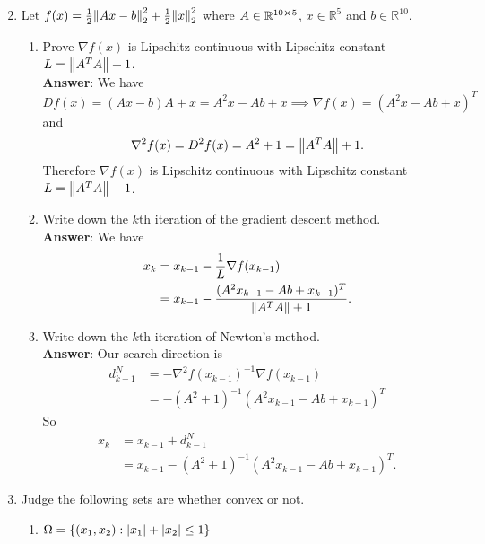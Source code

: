 \documentclass{article}
\begin{document}
\begin{enumerate}
\begin{enumerate}
\[                    \]
          \end{enumerate}
          \newpage
    \item Let $f(x)=\frac{1}{2}\norm{Ax-b}_2^2+\frac{1}{2}\norm{x}_2^2$ where $A\in\mathbb{R}^{10\cross 5}$, $x\in\mathbb{R}^5$ and $b\in\mathbb{R}^{10}$.
          \begin{enumerate}
              \item Prove $\nabla f(x)$ is Lipschitz continuous with Lipschitz constant $L=\norm{A^TA}+1$.\\
                    \textbf{Answer}: We have \[Df(x)=(Ax-b)A+x=A^2x-Ab+x\implies\nabla f(x)=(A^2x-Ab+x)^T\] and \[\nabla^2 f(x)=D^2f(x)=A^2+1=\norm{A^TA}+1.\] Therefore $\nabla f(x)$ is Lipschitz continuous with Lipschitz constant $L=\norm{A^TA}+1$.
              \item Write down the $k$th iteration of the gradient descent method.\\
                    \textbf{Answer}: We have \begin{align*}
                        x_k & =x_{k-1}-\dfrac{1}{L}\nabla f(x_{k-1})                     \\
                            & =x_{k-1}-\dfrac{(A^2x_{k-1}-Ab+x_{k-1})^T}{\norm{A^TA}+1}.
                    \end{align*}
              \item Write down the $k$th iteration of Newton's method.\\
                    \textbf{Answer}: Our search direction is
                    \begin{align*}
                        d_{k-1}^N & =-\nabla^2f(x_{k-1})^{-1}\nabla f(x_{k-1}) \\
                                  & =-(A^2+1)^{-1}(A^2x_{k-1}-Ab+x_{k-1})^T
                    \end{align*}
                    So
                    \begin{align*}
                        x_k & =x_{k-1}+ d_{k-1}^N                        \\
                            & =x_{k-1}-(A^2+1)^{-1}(A^2x_{k-1}-Ab+x_{k-1})^T.
                    \end{align*}
          \end{enumerate}
          \newpage
    \item Judge the following sets are whether convex or not.
          \begin{enumerate}
              \item $\Omega=\{(x_1,x_2):\abs{x_1}+\abs{x_2}\leq 1\}$\\

\end{enumerate}
\end{enumerate}
\end{document}
